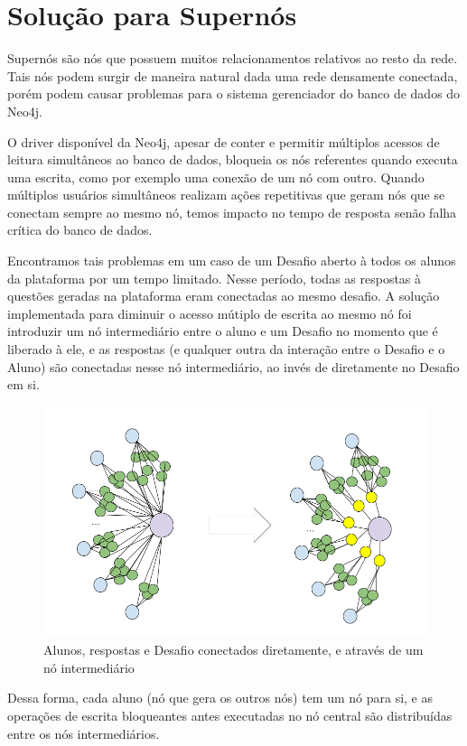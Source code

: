 \section{Solução para Supernós}

Supernós são nós que possuem muitos relacionamentos relativos ao resto da rede. Tais nós podem surgir de maneira natural dada uma rede densamente conectada, porém podem causar problemas para o sistema gerenciador do banco de dados do Neo4j.

O driver disponível da Neo4j, apesar de conter e permitir múltiplos acessos de leitura simultâneos ao banco de dados, bloqueia os nós referentes quando executa uma escrita, como por exemplo uma conexão de um nó com outro.
Quando múltiplos usuários simultâneos realizam ações repetitivas que geram nós que se conectam sempre ao mesmo nó, temos impacto no tempo de resposta senão falha crítica do banco de dados.

Encontramos tais problemas em um caso de um Desafio aberto à todos os alunos da plataforma por um tempo limitado. Nesse período, todas as respostas à questões geradas na plataforma eram conectadas ao mesmo desafio. A solução implementada para diminuir o acesso mútiplo de escrita ao mesmo nó foi introduzir um nó intermediário entre o aluno e um Desafio no momento que é liberado à ele, e as respostas (e qualquer outra da interação entre o Desafio e o Aluno) são conectadas nesse nó intermediário, ao invés de diretamente no Desafio em si.

    \begin{figure}[H]
        \centering
        \includegraphics[width=1.0\linewidth]{Imagens/chap05/AssignedContext.png}
        \caption{Alunos, respostas e Desafio conectados diretamente, e através de um nó intermediário}
        \label{fig:profile-exemple}
    \end{figure}
Dessa forma, cada aluno (nó que gera os outros nós) tem um nó para si, e as operações de escrita bloqueantes antes executadas no nó central são distribuídas entre os nós intermediários.

